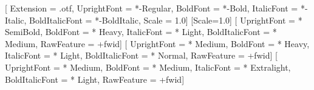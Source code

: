 \setmainfont{LibertinusSerif}[%
  Extension      = .otf,
  UprightFont    = *-Regular,
  BoldFont       = *-Bold,
  ItalicFont     = *-Italic,
  BoldItalicFont = *-BoldItalic,
  Scale          = 1.0]
\setmonofont{Iosevka}[Scale=1.0]%
[ %
  UprightFont     = * SemiBold,
  BoldFont        = * Heavy,
  ItalicFont      = * Light,
  BoldItalicFont  = * Medium,
  RawFeature      = +fwid]
[ %
  UprightFont     = * Medium,
  BoldFont        = * Heavy,
  ItalicFont      = * Light,
  BoldItalicFont  = * Normal,
  RawFeature      = +fwid]  
[%
  UprightFont     = * Medium,
  BoldFont        = * Medium,
  ItalicFont      = * Extralight,
  BoldItalicFont  = * Light,
  RawFeature      = +fwid]   

\newcommand{\nwafu}{西北农林科技大学}
\newcommand{\cie}{信息工程学院}
\newcommand{\ca}{农学院}
\newcommand{\cpp}{植物保护学院}
\newcommand{\ch}{园艺学院}
\newcommand{\cast}{动物科技学院}
\newcommand{\cvm}{动物医学院}
\newcommand{\cf}{林学院}
\newcommand{\claa}{风景园林艺术学院}
\newcommand{\cnre}{资源环境学院}
\newcommand{\cwrae}{水利与建筑工程学院}
\newcommand{\cmee}{机械与电子工程学院}
\newcommand{\cfse}{食品科学与工程学院}
\newcommand{\ce}{葡萄酒学院}
\newcommand{\cls}{生命科学学院}
\newcommand{\cs}{理学院}
\newcommand{\ccp}{化学与药学院}
\newcommand{\cem}{经济管理学院}
\newcommand{\cm}{马克思主义学院}
\newcommand{\dfl}{外语系}
\newcommand{\iec}{创新实验学院}
\newcommand{\ci}{国际学院}
\newcommand{\dpe}{体育部}
\newcommand{\cvae}{成人教育}
\newcommand{\iswc}{水土保持研究所}

\newcommand{\tomonth}{
  \the\year 年\the\month 月
}


\newcommand{\tomonthen}{
  \ifcase\the\month
  \or January%
  \or February%
  \or March%
  \or April%
  \or May%
  \or June%
  \or July%
  \or August%
  \or September%
  \or October%
  \or November%
  \or December%
  \fi, \the\year
}

\newcommand{\tosemester}{
  \the\year 年\ 
  \ifcase\the\month
  \or 秋%
  \or 春%
  \or 春%
  \or 春%
  \or 春%
  \or 春%
  \or 春%
  \or 夏%
  \or 秋%
  \or 秋%
  \or 秋%
  \or 秋%
  \fi 
}

